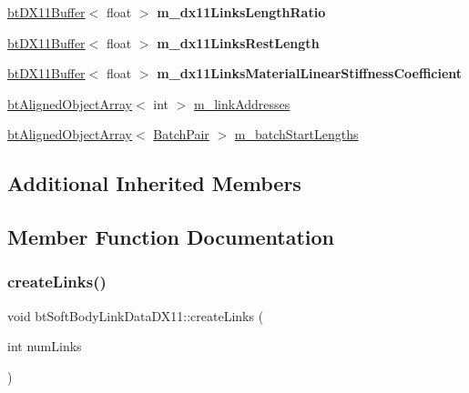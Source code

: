 \begin{DoxyCompactItemize}
\item 
\mbox{\label{classbtSoftBodyLinkDataDX11_a9e262a69749a8f95fa2b21bd5bed09b3}} 
\hyperlink{classbtDX11Buffer}{bt\+D\+X11\+Buffer}$<$ float $>$ {\bfseries m\+\_\+dx11\+Links\+Length\+Ratio}
\item 
\mbox{\label{classbtSoftBodyLinkDataDX11_adc4643ee4ecc041cb2c30c22a0013478}} 
\hyperlink{classbtDX11Buffer}{bt\+D\+X11\+Buffer}$<$ float $>$ {\bfseries m\+\_\+dx11\+Links\+Rest\+Length}
\item 
\mbox{\label{classbtSoftBodyLinkDataDX11_a3a427276815f97dabafa80d59752734f}} 
\hyperlink{classbtDX11Buffer}{bt\+D\+X11\+Buffer}$<$ float $>$ {\bfseries m\+\_\+dx11\+Links\+Material\+Linear\+Stiffness\+Coefficient}
\item 
\hyperlink{classbtAlignedObjectArray}{bt\+Aligned\+Object\+Array}$<$ int $>$ \hyperlink{classbtSoftBodyLinkDataDX11_a712400cc15cbe3fd96d93cfa135f53ef}{m\+\_\+link\+Addresses}
\item 
\hyperlink{classbtAlignedObjectArray}{bt\+Aligned\+Object\+Array}$<$ \hyperlink{structbtSoftBodyLinkDataDX11_1_1BatchPair}{Batch\+Pair} $>$ \hyperlink{classbtSoftBodyLinkDataDX11_af39feddd5c9c8beb3003fb07df835705}{m\+\_\+batch\+Start\+Lengths}
\end{DoxyCompactItemize}
\subsection*{Additional Inherited Members}


\subsection{Member Function Documentation}
\mbox{\label{classbtSoftBodyLinkDataDX11_a5844647a05674cc45bf99b658ba1804a}} 
\subsubsection{\texorpdfstring{create\+Links()}{createLinks()}\hspace{0.1cm}{\footnotesize\ttfamily [1/2]}}
{\footnotesize\ttfamily void bt\+Soft\+Body\+Link\+Data\+D\+X11\+::create\+Links (\begin{DoxyParamCaption}\item[{int}]{num\+Links }\end{DoxyParamCaption})\hspace{0.3cm}{\ttfamily [virtual]}}

